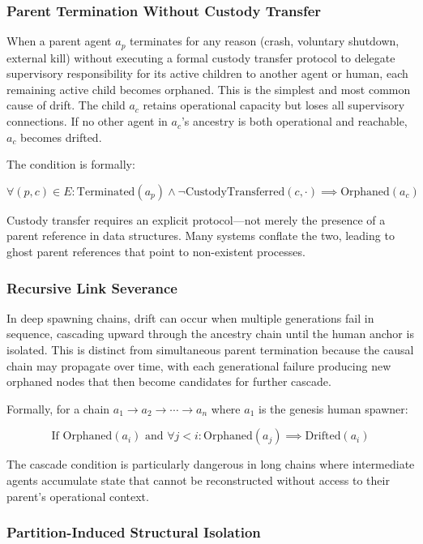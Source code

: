 \subsubsection{Parent Termination Without Custody Transfer}

When a parent agent $a_p$ terminates for any reason (crash, voluntary shutdown, external kill) without executing a formal custody transfer protocol to delegate supervisory responsibility for its active children to another agent or human, each remaining active child becomes orphaned. This is the simplest and most common cause of drift. The child $a_c$ retains operational capacity but loses all supervisory connections. If no other agent in $a_c$'s ancestry is both operational and reachable, $a_c$ becomes drifted.

The condition is formally:

\[
\forall (p, c) \in E : \text{Terminated}(a_p) \land \neg\text{CustodyTransferred}(c, \cdot) \implies \text{Orphaned}(a_c)
\]

Custody transfer requires an explicit protocol—not merely the presence of a parent reference in data structures. Many systems conflate the two, leading to ghost parent references that point to non-existent processes.

\subsubsection{Recursive Link Severance}

In deep spawning chains, drift can occur when multiple generations fail in sequence, cascading upward through the ancestry chain until the human anchor is isolated. This is distinct from simultaneous parent termination because the causal chain may propagate over time, with each generational failure producing new orphaned nodes that then become candidates for further cascade.

Formally, for a chain $a_1 \to a_2 \to \cdots \to a_n$ where $a_1$ is the genesis human spawner:

\[
\text{If } \text{Orphaned}(a_i) \text{ and } \forall j < i : \text{Orphaned}(a_j) \implies \text{Drifted}(a_i)
\]

The cascade condition is particularly dangerous in long chains where intermediate agents accumulate state that cannot be reconstructed without access to their parent's operational context.

\subsubsection{Partition-Induced Structural Isolation}


